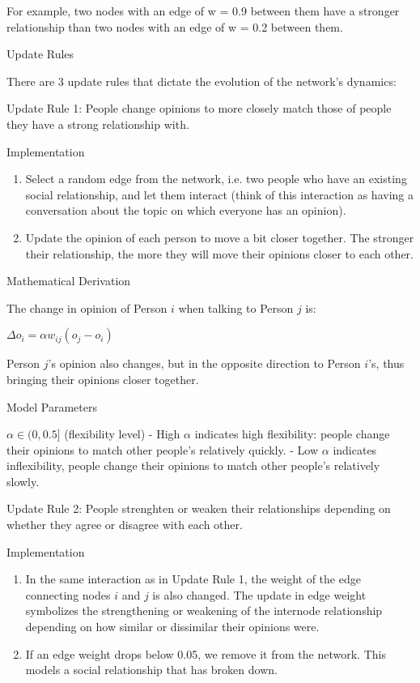 \documentclass[11pt]{article}
\begin{document}
For example, two nodes with an edge of w = 0.9 between them have a
stronger relationship than two nodes with an edge of w = 0.2 between
them.

Update Rules

There are 3 update rules that dictate the evolution of the network's
dynamics:

Update Rule 1: People change opinions to more closely match those of
people they have a strong relationship with.

Implementation

\begin{enumerate}
\def\labelenumi{\arabic{enumi})}
\item
  Select a random edge from the network, i.e. two people who have an
  existing social relationship, and let them interact (think of this
  interaction as having a conversation about the topic on which everyone
  has an opinion).
\item
  Update the opinion of each person to move a bit closer together. The
  stronger their relationship, the more they will move their opinions
  closer to each other.
\end{enumerate}

Mathematical Derivation

The change in opinion of Person \(i\) when talking to Person \(j\) is:

\(\Delta o_i = \alpha w_{ij}(o_j-o_i)\)

Person \(j\)'s opinion also changes, but in the opposite direction to
Person \(i\)'s, thus bringing their opinions closer together.

Model Parameters

\(\alpha \in (0,0.5]\) (flexibility level) - High \(\alpha\) indicates
high flexibility: people change their opinions to match other people's
relatively quickly. - Low \(\alpha\) indicates inflexibility, people
change their opinions to match other people's relatively slowly.

Update Rule 2: People strenghten or weaken their relationships depending
on whether they agree or disagree with each other.

Implementation

\begin{enumerate}
\def\labelenumi{\arabic{enumi})}
\item
  In the same interaction as in Update Rule 1, the weight of the edge
  connecting nodes \(i\) and \(j\) is also changed. The update in edge
  weight symbolizes the strengthening or weakening of the internode
  relationship depending on how similar or dissimilar their opinions
  were.
\item
  If an edge weight drops below 0.05, we remove it from the network.
  This models a social relationship that has broken down.
\end{enumerate}
\end{document}
